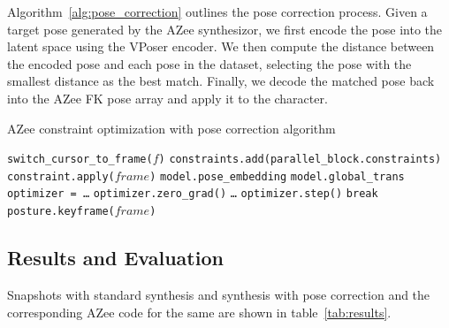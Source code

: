 \documentclass[../../main.tex]{subfiles}
\begin{document}
Algorithm~\ref{alg:pose_correction} outlines the pose correction process. Given a target pose generated by the AZee synthesizor, we first encode the pose into the latent space using the VPoser encoder. We then compute the distance between the encoded pose and each pose in the dataset, selecting the pose with the smallest distance as the best match. Finally, we decode the matched pose back into the AZee FK pose array and apply it to the character.

\begin{algorithm}
  \caption{AZee constraint optimization with pose correction algorithm}
  \label{alg:pose_correction}
  \begin{algorithmic}[1]
      \State \texttt{switch\_cursor\_to\_frame($f$)}
          \State \texttt{constraints.add(parallel\_block.constraints)}
      \EndFor
          \State \texttt{constraint.apply($frame$)}
      \EndFor
      \State \texttt{model.pose\_embedding}
      \State \texttt{model.global\_trans}
      \State \texttt{optimizer = \dots}
          \State \texttt{optimizer.zero\_grad()}
          \State \texttt{\dots}
          \State \texttt{optimizer.step()}
           \State \texttt{break} \EndIf
      \EndFor
      \State \texttt{posture.keyframe($frame$)}
  \EndFor
  \end{algorithmic}
  \end{algorithm}

\subsection{Results and Evaluation}
\label{ch:pose_correction:pose_correction_with_azee:results}

Snapshots with standard synthesis and synthesis with pose correction and the corresponding AZee code for the same are shown in table~\ref{tab:results}.
\end{document}
